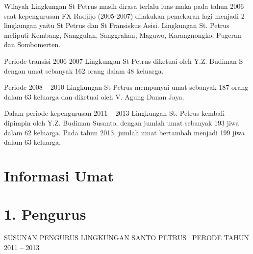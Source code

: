 \documentclass{article}
\begin{document}
Wilayah Lingkungan St Petrus masih dirasa terlalu luas maka pada tahun
2006 saat kepengurusan FX Radjijo (2005-2007) dilakukan pemekaran lagi
menjadi 2 lingkungan yaitu St Petrus dan St Fransiskus Asisi.
Lingkungan St. Petrus meliputi Kembang, Nanggulan, Sanggrahan, Maguwo,
Karangnongko, Pugeran dan Sombomerten. 

Periode transisi 2006-2007 Lingkungan St Petrus diketuai oleh Y.Z.
Budiman S dengan umat sebanyak 162 orang dalam 48 keluarga. 

Periode 2008 -- 2010 Lingkungan St Petrus mempunyai umat sebanyak 187
orang dalam 63 keluarga dan diketuai oleh V. Agung Danan Jaya.

Dalam  periode kepengurusan 2011 -- 2013 Lingkungan St. Petrus kembali
dipimpin oleh Y.Z. Budiman Susanto, dengan jumlah umat sebanyak 193
jiwa dalam 62 keluarga. Pada tahun 2013, jumlah umat bertambah menjadi
199 jiwa dalam 63 keluarga.

\section[Informasi Umat]{Informasi Umat}
\section[1. Pengurus]{1. Pengurus}
SUSUNAN PENGURUS LINGKUNGAN SANTO PETRUS~  PERODE TAHUN 2011 -- 2013
\end{document}
